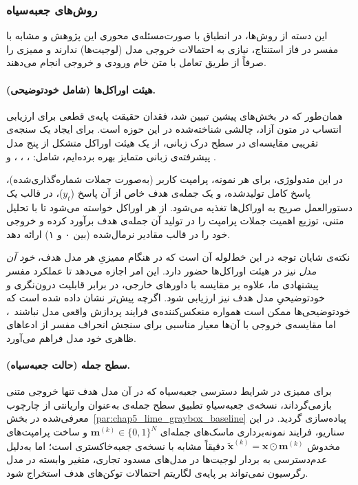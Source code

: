 \subsubsection{روش‌های جعبه‌سیاه}\label{sec:5-1-3-3}

این دسته از روش‌ها، در انطباق با صورت‌مسئله‌ی محوری این پژوهش و مشابه با مفسر  در فاز استنتاج، نیازی به احتمالات خروجی مدل (لوجیت‌ها) ندارند و ممیزی را صرفاً از طریق تعامل با متن خام ورودی و خروجی انجام می‌دهند.

\paragraph{هیئت اوراکل‌ها (شامل خودتوضیحی).}\label{par:chap5_oracles_baseline}
همان‌طور که در بخش‌های پیشین تبیین شد، فقدان حقیقت پایه‌ی قطعی برای ارزیابی انتساب در متون آزاد، چالشی شناخته‌شده در این حوزه است. برای ایجاد یک سنجه‌ی تقریبی مقایسه‌ای در سطح درک زبانی، از یک هیئت اوراکل متشکل از پنج مدل پیشرفته‌ی زبانی متمایز بهره برده‌ایم، شامل: ، ، ،  و . 

در این متدولوژی، برای هر نمونه، پرامپت کاربر (به‌صورت جملات شماره‌گذاری‌شده)، پاسخ کامل تولیدشده، و یک جمله‌ی هدف خاص از آن پاسخ ($y_t$)، در قالب یک دستورالعمل صریح به اوراکل‌ها تغذیه می‌شود. از هر اوراکل خواسته می‌شود تا با تحلیل متنی، توزیع اهمیت جملات پرامپت را در تولید آن جمله‌ی هدف برآورد کرده و خروجی خود را در قالب مقادیر نرمال‌شده (بین ۰ و ۱) ارائه دهد.

نکته‌ی شایان توجه در این خط‌لوله آن است که در هنگام ممیزیِ هر مدل هدف، \textit{خود آن مدل} نیز در هیئت اوراکل‌ها حضور دارد. این امر اجازه می‌دهد تا عملکرد مفسر پیشنهادی ما، علاوه بر مقایسه با داورهای خارجی، در برابر قابلیت درون‌نگری و خودتوضیحیِ مدل هدف نیز ارزیابی شود. اگرچه پیش‌تر نشان داده شده است که خودتوضیحی‌ها ممکن است همواره منعکس‌کننده‌ی فرایند پردازش واقعی مدل نباشند~\cite{turpin2023language}، اما مقایسه‌ی خروجی  با آن‌ها معیار مناسبی برای سنجش انحراف مفسر از ادعاهای ظاهری خود مدل فراهم می‌آورد.

\paragraph{ سطح جمله (حالت جعبه‌سیاه).}\label{par:chap5_lime_blackbox_baseline}
برای ممیزی در شرایط دسترسی جعبه‌سیاه که در آن مدل هدف تنها خروجی متنی بازمی‌گرداند، نسخه‌ی جعبه‌سیاهِ تطبیق سطح جمله‌ی  به‌عنوان واریانتی از چارچوب معرفی‌شده در بخش~\ref{par:chap5_lime_graybox_baseline} پیاده‌سازی گردید. در این سناریو، فرایند نمونه‌برداری ماسک‌های جمله‌ای $\mathbf{m}^{(k)} \in {\{0, 1\}}^N$ و ساخت پرامپت‌های مخدوش $\tilde{\mathbf{x}}^{(k)} = \mathbf{x} \odot \mathbf{m}^{(k)}$ دقیقاً مشابه با نسخه‌ی جعبه‌خاکستری است؛ اما به‌دلیل عدم‌دسترسی به بردار لوجیت‌ها در مدل‌های مسدود تجاری، متغیر وابسته در مدل رگرسیون نمی‌تواند بر پایه‌ی لگاریتم احتمالات توکن‌های هدف استخراج شود. 

